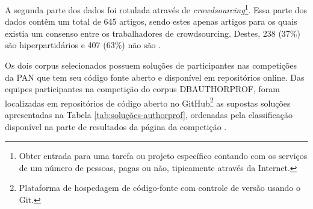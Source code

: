 \begin{itemize}
        A segunda parte dos dados foi rotulada através de \textit{crowdsourcing}\footnote{Obter entrada para uma tarefa ou projeto específico contando com os serviços de um número de pessoas, pagas ou não, tipicamente através da Internet.}. 
        Essa parte dos dados contêm um total de 645 artigos, sendo estes apenas artigos para os quais existia um consenso entre os trabalhadores de crowdsourcing. 
        Destes, 238 (37\%) são hiperpartidários e 407 (63\%) não são \cite{johannes_kiesel_2018_1489920}. 
        
    \end{itemize}
    
    Os dois corpus selecionados possuem soluções de participantes nas competições da PAN que tem seu código fonte aberto e disponível em repositórios online.
    Das equipes participantes na competição do corpus DB\underscore{}AUTHORPROF, foram localizadas em repositórios de código aberto no GitHub\footnote{Plataforma de hospedagem de código-fonte com controle de versão usando o Git.} as supostas soluções  apresentadas na Tabela \ref{tab:soluções-authorprof}, ordenadas pela classificação disponível na parte de resultados da página da competição .
        
        
